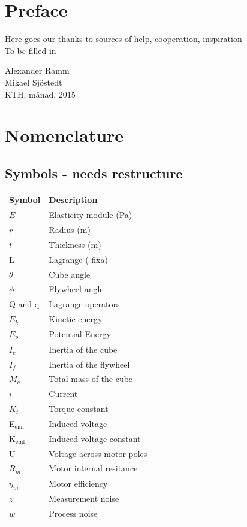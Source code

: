 \documentclass[a4paper,11pt]{kth-mag}
\newcommand{\textunderscript}[1]{$_{\text{#1}}$}
\begin{document}
\chapter*{Preface}
Here goes our thanks to sources of  help, cooperation, inspiration \\ To be filled in \\
\begin{flushright}Alexander Ramm \\Mikael Sjöstedt \\ KTH, månad, 2015 \end{flushright}




\cleardoublepage
{}
\printindex
\tableofcontents*

\cleardoublepage
\chapter*{Nomenclature}
\section*{Symbols - needs restructure}
\noindent{}\begin{tabular}{@{}p{2.5cm}l}
\textbf{Symbol} 	& \textbf{Description} \vspace{.5em} \\
$E$ 		& Elasticity module (Pa) \\
$r$		& Radius (m) \\
$t$		& Thickness (m) \\
L			& Lagrange ( fixa) \\
$\theta$		& Cube angle\\
$\phi$		& Flywheel angle \\
Q and q		& Lagrange operators \\
$E_k	$		& Kinetic energy \\
$E_p$		& Potential Energy \\
$I_c$		& Inertia of the cube\\
$I_f$		& Inertia of the flywheel\\
$M_c$		& Total mass of the cube\\
$i$			& Current\\
$K_t$		& Torque constant\\
E\textunderscript{emf} 	& Induced voltage \\
K\textunderscript{emf} 	& Induced voltage constant \\
U			& Voltage across motor poles\\
$R_m	$		& Motor internal resitance \\
$\eta_m$		& Motor efficiency\\	
$z$			& Measurement noise \\
$w$			& Process noise \\
\end{tabular}
\clearpage
\end{document}
